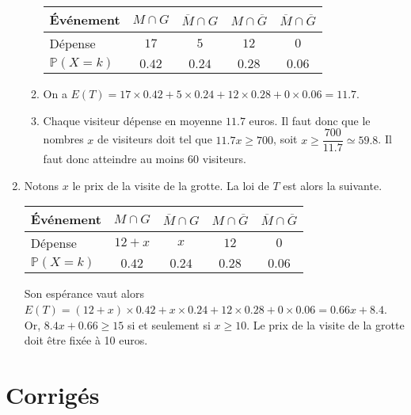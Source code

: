 \documentclass[11pt,fleqn, openany]{book} %
\begin{document}
\begin{solution}
\begin{enumerate}
\begin{enumerate}
\begin{center}
\begin{tabular}{|l|c|c|c|c|}
\hline
Événement & $M \cap G$ & $\overline{M}\cap G$ & $M \cap \overline{G}$ &$\overline{M} \cap \overline{G}$ \\
\hline
Dépense & $17$ & $5$ & $12$ & $0$ \\
\hline
$\mathbb{P}(X=k)$ & $0.42$  & $0.24$&$0.28$ & $0.06$\\
\hline \end{tabular}
\end{center}

\item On a $E(T)=17 \times 0.42 + 5 \times 0.24 + 12 \times 0.28 + 0 \times 0.06 = 11.7$.
\item Chaque visiteur dépense en moyenne $11.7$ euros. Il faut donc que le nombres $x$ de visiteurs doit tel que $11.7x \geqslant 700$, soit $x \geqslant \dfrac{700}{11.7}\simeq 59.8$. Il faut donc atteindre au moins 60 visiteurs.\end{enumerate}
\item Notons $x$ le prix de la visite de la grotte. La loi de $T$ est alors la suivante.

\begin{center}
\begin{tabular}{|l|c|c|c|c|}
\hline
Événement & $M \cap G$ & $\overline{M}\cap G$ & $M \cap \overline{G}$ &$\overline{M} \cap \overline{G}$ \\
\hline
Dépense& $12+x$ & $x$ & $12$ & $0$ \\
\hline
$\mathbb{P}(X=k)$ & $0.42$  & $0.24$&$0.28$ & $0.06$\\
\hline \end{tabular}
\end{center}

Son espérance vaut alors $E(T)=(12+x) \times 0.42 + x \times 0.24 + 12 \times 0.28 + 0 \times 0.06 = 0.66x+8.4$. Or, $8.4x+0.66\geqslant 15$ si et seulement si $x\geqslant 10$. Le prix de la visite de la grotte doit être fixée à 10 euros.\end{enumerate}\end{solution}




\chapter{Corrigés}


\printsolutions[headings={false} ]
\end{document}
